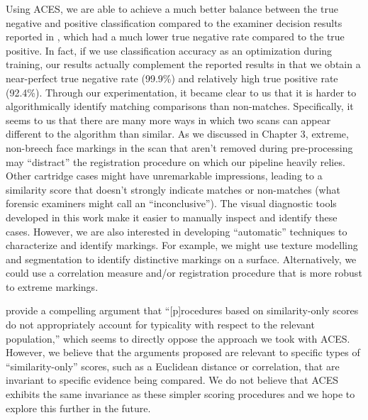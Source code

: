 \documentclass[11pt,]{isuthesis}
\begin{document}
Using ACES, we are able to achieve a much better balance between the true negative and positive classification compared to the examiner decision results reported in \citet{Baldwin2014}, which had a much lower true negative rate compared to the true positive.
In fact, if we use classification accuracy as an optimization during training, our results actually complement the \citet{Baldwin2014} reported results in that we obtain a near-perfect true negative rate (99.9\%) and relatively high true positive rate (92.4\%).
Through our experimentation, it became clear to us that it is harder to algorithmically identify matching comparisons than non-matches.
Specifically, it seems to us that there are many more ways in which two scans can appear different to the algorithm than similar.
As we discussed in Chapter 3, extreme, non-breech face markings in the scan that aren't removed during pre-processing may ``distract'' the registration procedure on which our pipeline heavily relies.
Other cartridge cases might have unremarkable impressions, leading to a similarity score that doesn't strongly indicate matches or non-matches (what forensic examiners might call an ``inconclusive'').
The visual diagnostic tools developed in this work make it easier to manually inspect and identify these cases.
However, we are also interested in developing ``automatic'' techniques to characterize and identify markings.
For example, we might use texture modelling and segmentation to identify distinctive markings on a surface.
Alternatively, we could use a correlation measure and/or registration procedure that is more robust to extreme markings.

\citet{Morrison2018} provide a compelling argument that ``{[}p{]}rocedures based on similarity-only scores do not appropriately account for typicality with respect to the relevant population,'' which seems to directly oppose the approach we took with ACES.
However, we believe that the arguments proposed are relevant to specific types of ``similarity-only'' scores, such as a Euclidean distance or correlation, that are invariant to specific evidence being compared.
We do not believe that ACES exhibits the same invariance as these simpler scoring procedures and we hope to explore this further in the future.
\end{document}
